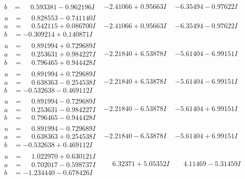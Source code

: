 \documentclass[1p]{elsarticle_modified}
\theoremstyle{definition}
\begin{document}
$$\begin{array}{c|c|c}
\begin{aligned}
b &= \phantom{-}0.593381 - 0.962196 I\end{aligned}
 & -2.41066 + 0.95663 I & -6.35494 - 0.97622 I \\ \hline\begin{aligned}
u &= \phantom{-}0.828553 - 0.741140 I \\
a &= \phantom{-}0.542115 + 0.086700 I \\
b &= -0.309214 + 0.140871 I\end{aligned}
 & -2.41066 + 0.95663 I & -6.35494 - 0.97622 I \\ \hline\begin{aligned}
u &= \phantom{-}0.891994 + 0.729689 I \\
a &= \phantom{-}0.253631 + 0.984227 I \\
b &= \phantom{-}0.796465 + 0.944428 I\end{aligned}
 & -2.21840 + 6.53878 I & -5.61404 - 6.99151 I \\ \hline\begin{aligned}
u &= \phantom{-}0.891994 + 0.729689 I \\
a &= \phantom{-}0.638363 - 0.254538 I \\
b &= -0.532638 - 0.469112 I\end{aligned}
 & -2.21840 + 6.53878 I & -5.61404 - 6.99151 I \\ \hline\begin{aligned}
u &= \phantom{-}0.891994 - 0.729689 I \\
a &= \phantom{-}0.253631 - 0.984227 I \\
b &= \phantom{-}0.796465 - 0.944428 I\end{aligned}
 & -2.21840 - 6.53878 I & -5.61404 + 6.99151 I \\ \hline\begin{aligned}
u &= \phantom{-}0.891994 - 0.729689 I \\
a &= \phantom{-}0.638363 + 0.254538 I \\
b &= -0.532638 + 0.469112 I\end{aligned}
 & -2.21840 - 6.53878 I & -5.61404 + 6.99151 I \\ \hline\begin{aligned}
u &= \phantom{-}1.022970 + 0.630121 I \\
a &= \phantom{-}0.702017 - 0.598737 I \\
b &= -1.234440 - 0.678426 I\end{aligned}
 & \phantom{-}6.32371 + 5.05352 I & \phantom{-}4.11469 - 5.31459 I \\ \hline\begin{aligned}

\end{aligned}
\end{array}$$
\end{document}

